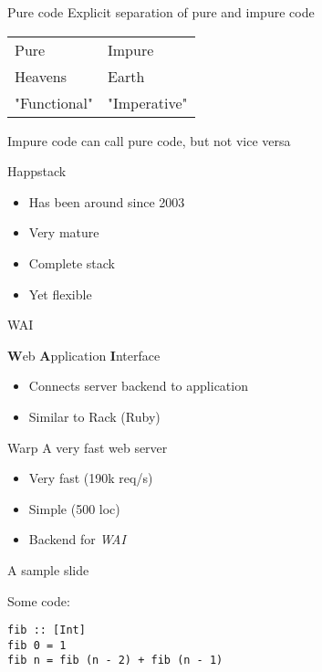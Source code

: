 \documentclass[20pt]{beamer}
\begin{document}
\begin{frame}{Pure code}
Explicit separation of pure and impure code \\
\vspace{5mm}
\begin{tabular}{l|l}
    Pure         & Impure \\
    Heavens      & Earth  \\
    "Functional" & "Imperative"
\end{tabular}
\newline
\vspace{5mm}

Impure code can call pure code, but not vice versa
\end{frame}


\begin{frame}{Happstack}
    \begin{itemize}
        \item Has been around since 2003
        \item Very mature
        \item Complete stack
        \item Yet flexible
    \end{itemize}
\end{frame}

\begin{frame}{WAI}

    {\bf W}eb {\bf A}pplication {\bf I}nterface
    \begin{itemize}
        \item Connects server backend to application
        \item Similar to Rack (Ruby)
    \end{itemize}
\end{frame}

\begin{frame}{Warp}
    A very fast web server
    \begin{itemize}
        \item Very fast (190k req/s)
        \item Simple (500 loc)
        \item Backend for \emph{WAI}
    \end{itemize}
\end{frame}


\begin{frame}[fragile]{A sample slide}

Some code:

\begin{lstlisting}
fib :: [Int]
fib 0 = 1
fib n = fib (n - 2) + fib (n - 1)
\end{lstlisting}

\end{frame}
\end{document}

